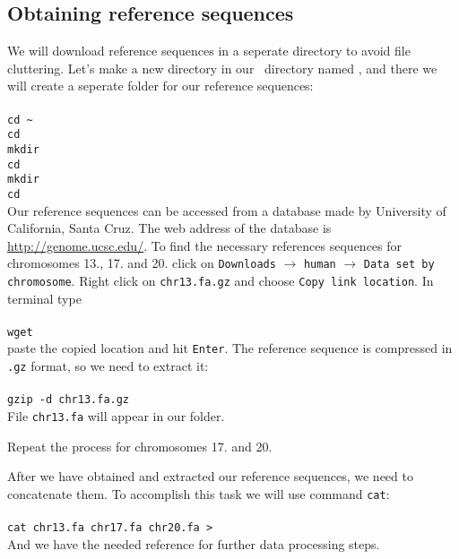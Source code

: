 \subsection{Obtaining reference sequences}
We will download reference sequences in a seperate directory to avoid file cluttering. Let's make
a new directory in our \texttt{\workDir}~directory named \texttt{\reseqDir}, and there we will create
a seperate folder \texttt{} for our reference sequences:\\~\\
\texttt{cd \textasciitilde}\\
\texttt{cd \workDir}\\
\texttt{mkdir \reseqDir}\\
\texttt{cd \reseqDir}\\
\texttt{mkdir }\\
\texttt{cd }\\

Our reference sequences can be accessed from a database made by
University of California, Santa Cruz.
The web address of the database is \url{http://genome.ucsc.edu/}.
To find the necessary references sequences for chromosomes 13., 17. and 20.
click on \texttt{Downloads} $\rightarrow$ \texttt{human} $\rightarrow$
\texttt{Data set by chromosome}. Right click on \texttt{chr13.fa.gz}
and choose \texttt{Copy link location}. In terminal type\\~\\
\texttt{wget} \\

paste the copied location and hit \texttt{Enter}. The reference sequence is compressed in \texttt{.gz}
format, so we need to extract it:\\~\\
\texttt{gzip -d chr13.fa.gz}\\

File \texttt{chr13.fa} will appear in our folder.

Repeat the process for chromosomes 17. and 20.

After we have obtained and extracted our reference sequences, we need to concatenate them.
To accomplish this task we will use command \texttt{cat}:\\~\\
\texttt{cat chr13.fa chr17.fa chr20.fa > }\\

And we have the needed reference for further data processing steps.


